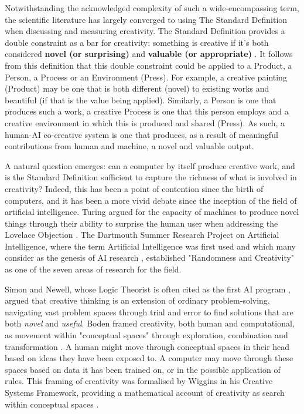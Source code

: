 Notwithstanding the acknowledged complexity of such a wide-encompassing term, the scientific literature has largely converged to using The Standard Definition when discussing and measuring creativity. The Standard Definition provides a double constraint as a bar for creativity: something is creative if it's both considered \textbf{novel (or surprising)} and \textbf{valuable (or appropriate)} \cite{Amabile1983-lj, Sternberg1998-oz, Runco2012-mk, Boden2003-hk}. It follows from this definition that this double constraint could be applied to a Product, a Person, a Process or an Environment (Press). For example, a creative painting (Product) may be one that is both different (novel) to existing works and beautiful (if that is the value being applied). Similarly, a Person is one that produces such a work, a creative Process is one that this person employs and a creative environment in which this is produced and shared (Press). As such, a human-AI co-creative system is one that produces, as a result of meaningful contributions from human and machine, a novel and valuable output. 

A natural question emerges: can a computer by itself produce creative work, and is the Standard Definition sufficient to capture the richness of what is involved in creativity? Indeed, this has been a point of contention since the birth of computers, and it has been a more vivid debate since the inception of the field of artificial intelligence. Turing argued for the capacity of machines to produce novel things through their ability to surprise the human user when addressing the Lovelace Objection \cite{Turing1950-aq}. The Dartmouth Summer Research Project on Artificial Intelligence, where the term Artificial Intelligence was first used and which many consider as the genesis of AI research \cite{McCarthy1955-ls}, established "Randomness and Creativity" as one of the seven areas of research for the field. 

Simon and Newell, whose Logic Theorist is often cited as the first AI program \cite{Russell2016-oe}, argued that creative thinking is an extension of ordinary problem‑solving, navigating vast problem spaces through trial and error to find solutions that are both \textit{novel} and \textit{useful}\cite{Simon1967-nr}. Boden framed creativity, both human and computational, as movement within "conceptual spaces" through exploration, combination and transformation \cite{Boden2003-hk}. A human might move through conceptual spaces in their head based on ideas they have been exposed to. A computer may move through these spaces based on data it has been trained on, or in the possible application of rules. This framing of creativity was formalised by Wiggins in his Creative Systems Framework, providing a mathematical account of creativity as search within conceptual spaces \cite{Wiggins2006-zd}.

